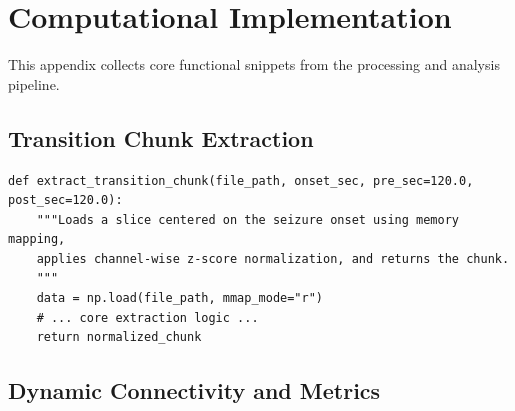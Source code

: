\section{Computational Implementation}
\label{app:code}

This appendix collects core functional snippets from the processing and analysis pipeline.

\subsection{Transition Chunk Extraction}
\lipsum[1-2]

\begin{lstlisting}
def extract_transition_chunk(file_path, onset_sec, pre_sec=120.0, post_sec=120.0):
    """Loads a slice centered on the seizure onset using memory mapping,
    applies channel-wise z-score normalization, and returns the chunk.
    """
    data = np.load(file_path, mmap_mode="r")
    # ... core extraction logic ...
    return normalized_chunk
\end{lstlisting}

\subsection{Dynamic Connectivity and Metrics}
\lipsum[3-4]